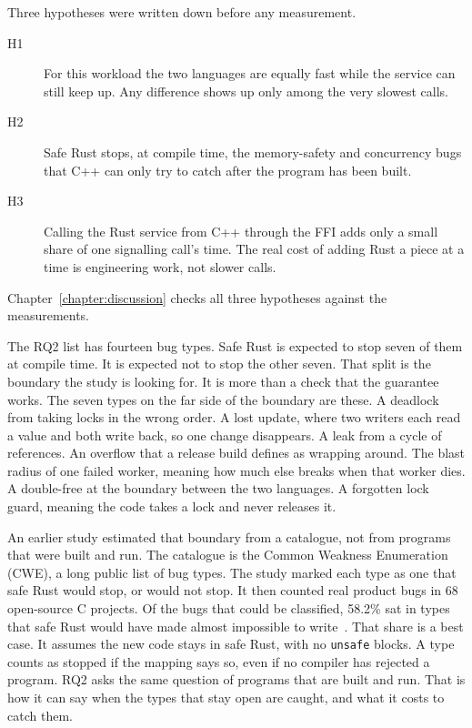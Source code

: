 \documentclass[english,oneside,a4paper,censored,csm,software-track-2020]{HYthesisML}
\begin{document}
Three hypotheses were written down before any measurement.
\begin{description}
  \item[H1] For this workload the two languages are equally fast while the service can still keep up.
        Any difference shows up only among the very slowest calls.
  \item[H2] Safe Rust stops, at compile time, the memory-safety and concurrency bugs that C++ can only try to catch after the program has been built.
  \item[H3] Calling the Rust service from C++ through the FFI adds only a small share of one signalling call's time.
        The real cost of adding Rust a piece at a time is engineering work, not slower calls.
\end{description}
Chapter~\ref{chapter:discussion} checks all three hypotheses against the measurements.

The RQ2 list has fourteen bug types.
Safe Rust is expected to stop seven of them at compile time.
It is expected not to stop the other seven.
That split is the boundary the study is looking for. It is more than a check that the guarantee works.
The seven types on the far side of the boundary are these.
A deadlock from taking locks in the wrong order.
A lost update, where two writers each read a value and both write back, so one change disappears.
A leak from a cycle of references.
An overflow that a release build defines as wrapping around.
The blast radius of one failed worker, meaning how much else breaks when that worker dies.
A double-free at the boundary between the two languages.
A forgotten lock guard, meaning the code takes a lock and never releases it.

An earlier study estimated that boundary from a catalogue, not from programs that were built and run.
The catalogue is the Common Weakness Enumeration (CWE), a long public list of bug types.
The study marked each type as one that safe Rust would stop, or would not stop.
It then counted real product bugs in 68 open-source C projects.
Of the bugs that could be classified, 58.2\% sat in types that safe Rust would have made almost impossible to write~\cite{meneely2025justuserust}.
That share is a best case. It assumes the new code stays in safe Rust, with no \texttt{unsafe} blocks.
A type counts as stopped if the mapping says so, even if no compiler has rejected a program.
RQ2 asks the same question of programs that are built and run.
That is how it can say when the types that stay open are caught, and what it costs to catch them.
\end{document}

